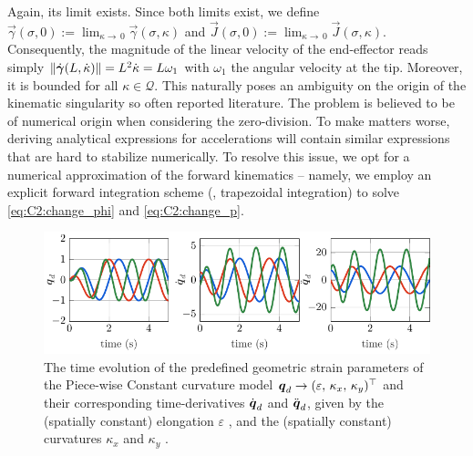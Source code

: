 \begin{rmk}
 Again, its limit exists. Since both limits exist, we define $\vec{\gamma}(\sigma,0):= \lim_{\kappa \to \,0} \vec{\gamma}(\sigma,\kappa)$ and $\vec{J}(\sigma,0):= \lim_{\kappa \to \,0} \vec{J}(\sigma,\kappa)$. Consequently, the magnitude of the linear velocity of the end-effector reads simply $\lVert \dot{{\boldsymbol{\gamma}}}(L,\dot{\kappa}) \rVert = L^2\dot{\kappa} = L \omega_1$ with $\omega_1$ the angular velocity at the tip. Moreover, it is bounded for all $\kappa \in \mathcal{Q}$. This naturally poses an ambiguity on the origin of the kinematic singularity so often reported literature. The problem is believed to be of numerical origin when considering the zero-division. To make matters worse, deriving analytical expressions for accelerations will contain similar expressions that are hard to stabilize numerically. To resolve this issue, we opt for a numerical approximation of the forward kinematics -- namely, we employ an explicit forward integration scheme (\ie, trapezoidal integration) to solve \eqref{eq:C2:change_phi} and \eqref{eq:C2:change_p}.
\end{rmk}

\begin{figure}[!b]
  \includegraphics*[width = \textwidth]{./pdf/thesis-figure-4-3.pdf}
  \caption{The time evolution of the predefined geometric strain parameters of the Piece-wise Constant curvature model ${\boldsymbol{q}}_d \to  (\varepsilon, \, \kappa_x,\,\kappa_y)^\top$ and their corresponding time-derivatives ${\dot{\boldsymbol{q}}}_d$ and ${\ddot{\boldsymbol{q}}}_d$, given by the (spatially constant) elongation $\varepsilon$ , and the  (spatially constant) curvatures $\kappa_x$  and $\kappa_y$ .}
  \label{fig:C2:EX1:strain_ref}
\end{figure}

